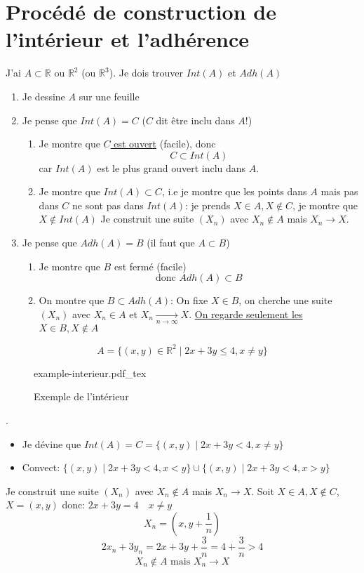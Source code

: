 \documentclass[a4paper]{report}
\newcommand\R{\ensuremath{\mathbb{R}}}
\theoremstyle{definition}
\newcommand{\incfig}[1]{%
    \def\svgwidth{\columnwidth}
    {#1.pdf_tex}
}
\begin{document}
\section{Procédé de construction de l'intérieur et l'adhérence}
J'ai $A \subset \R$ ou $\R^2$ (ou $\R^3$). Je dois trouver $Int(A)$ et  $Adh(A)$
 \begin{enumerate}
    \item Je dessine $A$ sur une feuille
    \item Je pense que  $Int(A) = C$ ($C$ dit être inclu dans  $A$!)
         \begin{enumerate}
             \item Je montre que \underline{$C$ est ouvert} (facile), donc
                 \[
                 C \subset Int(A)
                 \] 
                 car $Int(A)$ est le plus grand ouvert inclu dans  $A$.
            \item Je montre que $Int(A) \subset C$, i.e je montre que les points dans $A$ mais pas dans  $C$ ne sont pas dans  $Int(A)$: je prends $X \in A, X \not\in C$, je montre que $X \not\in Int(A)$
                Je construit une suite $(X_n)$ avec  $X_n \not\in A$ mais  $X_n \to X$.
         \end{enumerate}
    \item Je pense que $Adh(A) = B$ (il faut que $A \subset B$)
        \begin{enumerate}
            \item Je montre que $B$ est fermé (facile)
                \[
                \text{donc } Adh(A) \subset B
                \] 
            \item  On montre que $B \subset Adh(A)$: On fixe $X \in B$, on cherche une suite  $(X_n)$ avec  $X_n \in A$ et  $X_n \xrightarrow[n \to \infty]{} X$. 
                \underline{On regarde seulement les} $X \in B, X \not\in A$
        \end{enumerate}
\end{enumerate}
\begin{eg}
   \[
       A = \{(x, y) \in \R^2 \mid 2x + 3y \le 4, x \neq y\}
   \]  
\begin{figure}[H]
    \centering
    \incfig{example-interieur}
    \caption{Exemple de l'intérieur}
    \label{fig:example-interieur}
\end{figure}
.
\begin{itemize}
    \item 
        Je dévine que $Int(A) = C = \{(x, y) \mid 2x + 3y < 4, x \neq y\}$
    \item
        Convect: $\{(x, y) \mid 2x + 3y < 4, x < y\} \cup \{(x, y) \mid 2x + 3y < 4, x > y\}$
\end{itemize}
Je construit une suite $(X_n)$ avec  $X_n \not\in A$ mais $X_n \to X$. Soit $X \in A, X \not\in C$, $X = (x, y)$ donc:  $2x + 3y = 4 \quad x \neq y$
\[
X_n = (x, y + \frac{1}{n})
\] 
\[
2x_n + 3y_n = 2x + 3y + \frac{3}{n} = 4 + \frac{3}{n} > 4
\] 
\[
X_n \not\in A \text{ mais } X_n \to X
\] 
\end{eg}
\end{document}
